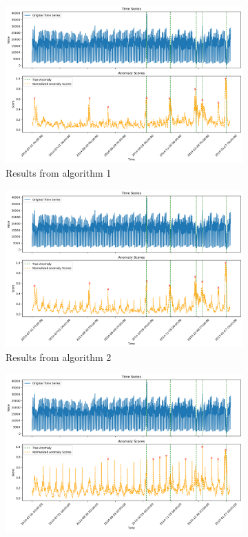 \documentclass[11pt]{article}
\begin{document}
\begin{figure}[h]
    \centering
    \begin{subfigure}[b]{0.6\textwidth}
        \includegraphics[width=\textwidth]{algo1.png}
        \caption{Results from algorithm 1}
        \label{fig:algo1}
    \end{subfigure}
    \hfill
    \begin{subfigure}[b]{0.6\textwidth}
        \includegraphics[width=\textwidth]{algo2.png}
        \caption{Results from algorithm 2}
        \label{fig:algo2}
    \end{subfigure}
    \begin{subfigure}[b]{0.6\textwidth}
        \includegraphics[width=\textwidth]{algo3.png}

\end{subfigure}
\end{figure}
\end{document}
